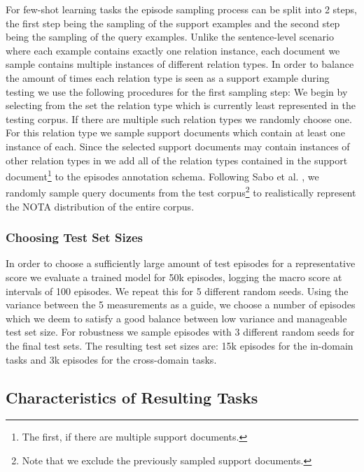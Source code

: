 \documentclass[11pt]{article}
\begin{document}
For few-shot learning tasks the episode sampling process can be split into 2 steps, the first step being the sampling of the support examples and the second step being the sampling of the query examples. 
Unlike the sentence-level scenario where each example contains exactly one relation instance, each document we sample contains multiple instances of different relation types. 
In order to balance the amount of times each relation type is seen as a support example during testing we use the following procedures for the first sampling step: 
We begin by selecting from the set  the relation type  which is currently least represented in the testing corpus. 
If there are multiple such relation types we randomly choose one. 
For this relation type we sample support documents which contain at least one instance of  each. 
Since the selected support documents may contain instances of other relation types in  we add all of the relation types contained in the support document\footnote{The first, if there are multiple support documents.} to the episodes annotation schema. 
Following Sabo et al. \cite{sabo_revisiting_2021}, we randomly sample query documents from the test corpus\footnote{Note that we exclude the previously sampled support documents.} to realistically represent the NOTA distribution of the entire corpus.

\subsubsection{Choosing Test Set Sizes}


In order to choose a sufficiently large amount of test episodes for a representative  score we evaluate a trained model for 50k episodes, logging the macro  score at intervals of 100 episodes. 
We repeat this for 5 different random seeds. 
Using the variance between the 5 measurements as a guide, we choose a number of episodes which we deem to satisfy a good balance between low variance and manageable test set size. 
For robustness we sample episodes with 3 different random seeds for the final test sets.
The resulting test set sizes are: 15k episodes for the in-domain tasks and 3k episodes for the cross-domain tasks.

\subsection{Characteristics of Resulting Tasks}
\end{document}
